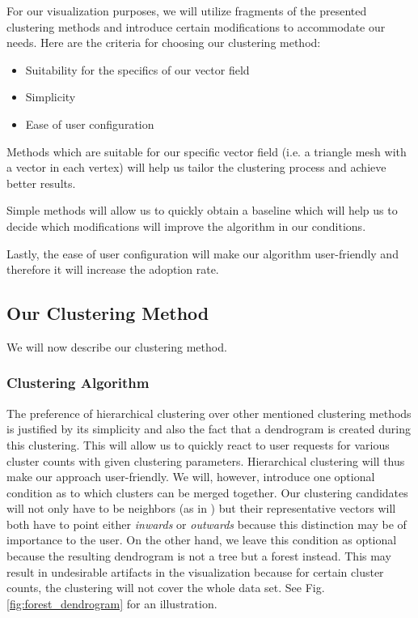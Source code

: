 For our visualization purposes, we will utilize fragments of the presented clustering methods and introduce certain modifications to accommodate our needs. Here are the criteria for choosing our clustering method:

\begin{itemize}
\item Suitability for the specifics of our vector field
\item Simplicity
\item Ease of user configuration
\end{itemize}

Methods which are suitable for our specific vector field (i.e. a triangle mesh with a vector in each vertex) will help us tailor the clustering process and achieve better results. 

Simple methods will allow us to quickly obtain a baseline which will help us to decide which modifications will improve the algorithm in our conditions. 

Lastly, the ease of user configuration will make our algorithm user-friendly and therefore it will increase the adoption rate.

\subsection{Our Clustering Method}

We will now describe our clustering method.

\subsubsection{Clustering Algorithm}
\label{sec:analysis_clustering_algorithm}

The preference of hierarchical clustering over other mentioned clustering methods is justified by its simplicity and also the fact that a dendrogram is created during this clustering. This will allow us to quickly react to user requests for various cluster counts with given clustering parameters. Hierarchical clustering will thus make our approach user-friendly. We will, however, introduce one optional condition as to which clusters can be merged together. Our clustering candidates will not only have to be neighbors (as in \citet{Telea99}) but their representative vectors will both have to point either {\it inwards} or {\it outwards} because this distinction may be of importance to the user. On the other hand, we leave this condition as optional because the resulting dendrogram is not a tree but a forest instead. This may result in undesirable artifacts in the visualization because for certain cluster counts, the clustering will not cover the whole data set. See Fig. \ref{fig:forest_dendrogram} for an illustration.

